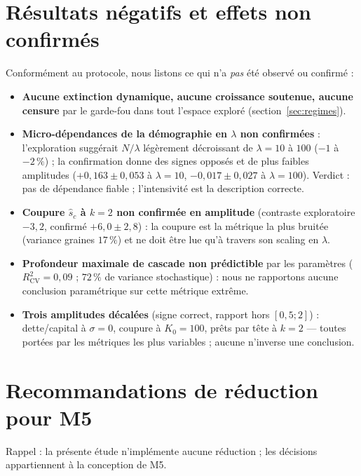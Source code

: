 \documentclass[11pt,a4paper]{article}
\begin{document}
\section{Résultats négatifs et effets non confirmés}
\label{sec:negatifs}

Conformément au protocole, nous listons ce qui n'a \emph{pas} été
observé ou confirmé :

\begin{itemize}
\item \textbf{Aucune extinction dynamique, aucune croissance soutenue,
  aucune censure} par le garde-fou dans tout l'espace exploré
  (section~\ref{sec:regimes}).
\item \textbf{Micro-dépendances de la démographie en $\lambda$ non
  confirmées} : l'exploration suggérait $N/\lambda$ légèrement
  décroissant de $\lambda=10$ à $100$ ($-1$ à $-2\,\%$) ; la
  confirmation donne des signes opposés et de plus faibles amplitudes
  ($+0{,}163\pm0{,}053$ à $\lambda=10$, $-0{,}017\pm0{,}027$ à
  $\lambda=100$). Verdict : pas de dépendance fiable ; l'intensivité
  est la description correcte.
\item \textbf{Coupure $\hat s_c$ à $k=2$ non confirmée en amplitude}
  (contraste exploratoire $-3{,}2$, confirmé $+6{,}0\pm2{,}8$) : la
  coupure est la métrique la plus bruitée (variance graines $17\,\%$)
  et ne doit être lue qu'à travers son scaling en $\lambda$.
\item \textbf{Profondeur maximale de cascade non prédictible} par les
  paramètres ($R^2_{\mathrm{CV}}=0{,}09$ ; $72\,\%$ de variance
  stochastique) : nous ne rapportons aucune conclusion paramétrique sur
  cette métrique extrême.
\item \textbf{Trois amplitudes décalées} (signe correct, rapport hors
  $[0{,}5;2]$) : dette/capital à $\sigma=0$, coupure à $K_0=100$,
  prêts par tête à $k=2$ — toutes portées par les métriques les plus
  variables ; aucune n'inverse une conclusion.
\end{itemize}

\section{Recommandations de réduction pour M5}
\label{sec:reduction}

Rappel : la présente étude n'implémente aucune réduction ; les
décisions appartiennent à la conception de M5.
\end{document}
